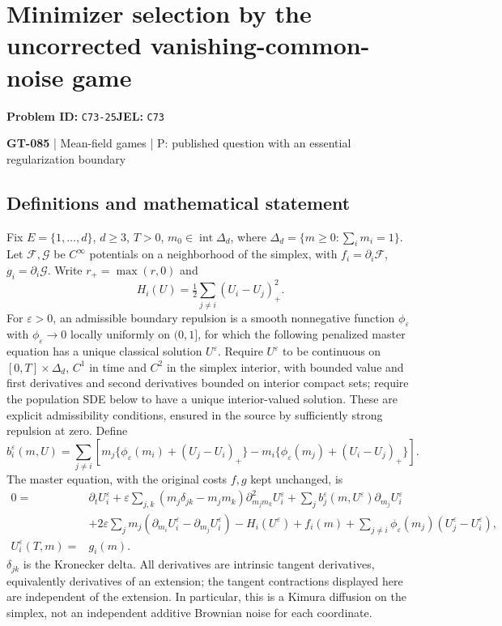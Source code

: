 \documentclass[11pt,a4paper]{article}
\begin{document}
\section*{Minimizer selection by the uncorrected vanishing-common-noise game}
\textbf{Problem ID:} \texttt{C73-25}\quad \textbf{JEL:} \texttt{C73}\par
\label{problem:OP-0215}
\label{game:GT-085}
{\sffamily\small\color{muted}
{\small\textbf{GT-085} | Mean-field games | P: published question with an essential regularization boundary\par}
\par}
\subsection*{Definitions and mathematical statement}
Fix $E=\{1,\ldots,d\}$, $d\geq3$, $T>0$, $m_0\in\operatorname{int}\Delta_d$, where $\Delta_d=\{m\geq0:\sum_i m_i=1\}$. Let $\mathcal F,\mathcal G$ be $C^\infty$ potentials on a neighborhood of the simplex, with $f_i=\partial_i\mathcal F$, $g_i=\partial_i\mathcal G$. Write $r_+=\max(r,0)$ and
\[
 H_i(U)=\tfrac12\sum_{j\ne i}(U_i-U_j)_+^2.
\]
For $\varepsilon>0$, an admissible boundary repulsion is a smooth nonnegative function $\phi_\varepsilon$ with $\phi_\varepsilon\to0$ locally uniformly on $(0,1]$, for which the following penalized master equation has a unique classical solution $U^\varepsilon$. Require $U^\varepsilon$ to be continuous on $[0,T]\times\Delta_d$, $C^1$ in time and $C^2$ in the simplex interior, with bounded value and first derivatives and second derivatives bounded on interior compact sets; require the population SDE below to have a unique interior-valued solution. These are explicit admissibility conditions, ensured in the source by sufficiently strong repulsion at zero. Define
\[
 b_i^\varepsilon(m,U)=\sum_{j\ne i}
 \left[m_j\{\phi_\varepsilon(m_i)+(U_j-U_i)_+\}
       -m_i\{\phi_\varepsilon(m_j)+(U_i-U_j)_+\}\right].
\]
The master equation, with the original costs $f,g$ kept unchanged, is
\[
 \begin{split}
 0={}&\partial_tU_i^\varepsilon
 +\varepsilon\sum_{j,k}(m_j\delta_{jk}-m_jm_k)\partial_{m_jm_k}^2U_i^\varepsilon
 +\sum_j b_j^\varepsilon(m,U^\varepsilon)\partial_{m_j}U_i^\varepsilon\\
 &+2\varepsilon\sum_jm_j(\partial_{m_i}U_i^\varepsilon-\partial_{m_j}U_i^\varepsilon)
 -H_i(U^\varepsilon)+f_i(m)
 +\sum_{j\ne i}\phi_\varepsilon(m_j)(U_j^\varepsilon-U_i^\varepsilon),\\
 U_i^\varepsilon(T,m)={}&g_i(m).
 \end{split}
\]
$\delta_{jk}$ is the Kronecker delta. All derivatives are intrinsic tangent derivatives, equivalently derivatives of an extension; the tangent contractions displayed here are independent of the extension. In particular, this is a Kimura diffusion on the simplex, not an independent additive Brownian noise for each coordinate.
\end{document}
